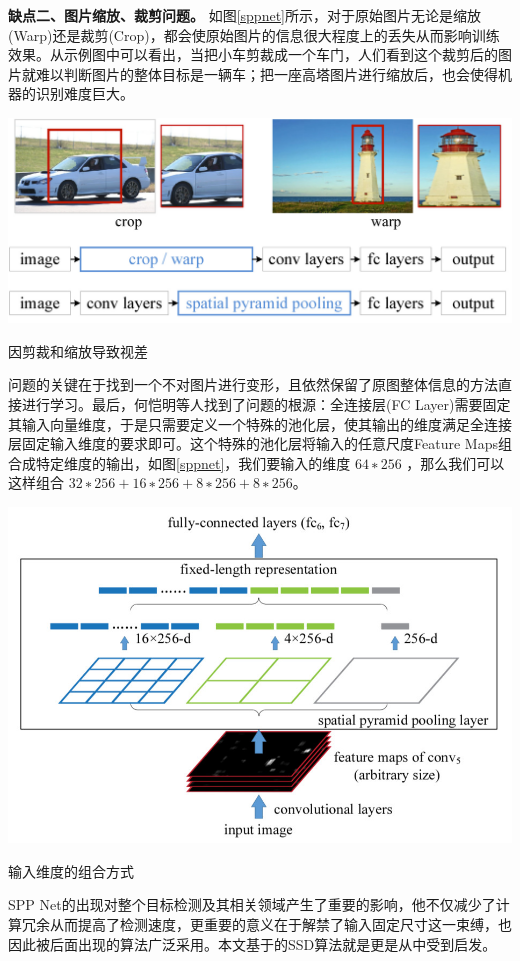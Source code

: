 \textbf{缺点二、图片缩放、裁剪问题。}
如图\ref{sppnet}所示，对于原始图片无论是缩放(Warp)还是裁剪(Crop)，都会使原始图片的信息很大程度上的丢失从而影响训练效果。从示例图中可以看出，当把小车剪裁成一个车门，人们看到这个裁剪后的图片就难以判断图片的整体目标是一辆车；把一座高塔图片进行缩放后，也会使得机器的识别难度巨大。
\begin{uscfigure}
	\includegraphics[width=\textwidth]{./Pictures/sppnet_crop_warp.jpg}	
	\caption{因剪裁和缩放导致视差}
	\label{sppnet}
\end{uscfigure}
问题的关键在于找到一个不对图片进行变形，且依然保留了原图整体信息的方法直接进行学习。最后，何恺明等人找到了问题的根源：全连接层(FC Layer)需要固定其输入向量维度，于是只需要定义一个特殊的池化层，使其输出的维度满足全连接层固定输入维度的要求即可。这个特殊的池化层将输入的任意尺度Feature Maps组合成特定维度的输出，如图\ref{sppnet}，我们要输入的维度 $64∗256$ ，那么我们可以这样组合 $32∗256+16∗256+8∗256+8∗256$。
\begin{uscfigure}
	\includegraphics[width=\textwidth,]{./Pictures/sppnet_pool_layer.jpg}	
	\caption{输入维度的组合方式}
	\label{sppnet}
\end{uscfigure}
SPP Net的出现对整个目标检测及其相关领域产生了重要的影响，他不仅减少了计算冗余从而提高了检测速度，更重要的意义在于解禁了输入固定尺寸这一束缚，也因此被后面出现的算法广泛采用。本文基于的SSD算法就是更是从中受到启发。

